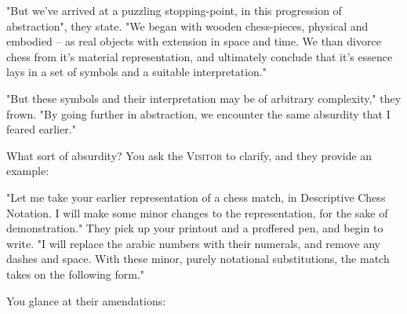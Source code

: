 "But we've arrived at a puzzling stopping-point, in this progression of abstraction", they state. "We began with wooden chess-pieces, physical and embodied -- as real objects with extension in space and time. We than divorce chess from it's material representation, and ultimately conclude that it's essence lays in a set of symbols and a suitable interpretation."

"But these symbols and their interpretation may be of arbitrary complexity," they frown. "By going further in abstraction, we encounter the same absurdity that I feared earlier."

What sort of absurdity? You ask the \textsc{Visitor} to clarify, and they provide an example:

"Let me take your earlier representation of a chess match, in Descriptive Chess Notation. I will make some minor changes to the representation, for the sake of demonstration." They pick up your printout and a proffered pen, and begin to write. "I will replace the arabic numbers with their numerals, and remove any dashes and space. With these minor, purely notational substitutions, the match takes on the following form."

You glance at their amendations:


\noindent
\begin{center}
\end{center}

